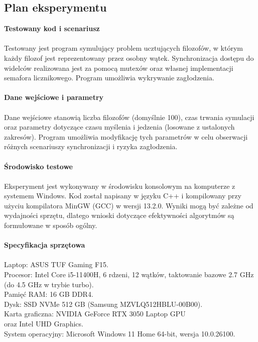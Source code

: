 \documentclass[a4paper,12pt]{article}
\begin{document}
        \subsection{Plan eksperymentu}
            \vspace{1em}
        	\textbf{Testowany kod i scenariusz}\\
            \vspace{-1.0em}\\
            Testowany jest program symulujący problem ucztujących filozofów, w którym każdy filozof jest reprezentowany przez osobny wątek. Synchronizacja dostępu do widelców realizowana jest za pomocą mutexów oraz własnej implementacji semafora licznikowego. Program umożliwia wykrywanie zagłodzenia.\\
            \vspace{0.5em}\\
        	\textbf{Dane wejściowe i parametry}\\
            \vspace{-1.0em}\\
            Dane wejściowe stanowią liczba filozofów (domyślnie 100), czas trwania symulacji oraz parametry dotyczące czasu myślenia i jedzenia (losowane z ustalonych zakresów). Program umożliwia modyfikację tych parametrów w celu obserwacji różnych scenariuszy synchronizacji i ryzyka zagłodzenia.\\
            \vspace{0.5em}\\
        	\textbf{Środowisko testowe}\\
            \vspace{-0.5em}\\
            Eksperyment jest wykonywany w środowisku konsolowym na komputerze z systemem Windows. Kod został napisany w języku C++ i kompilowany przy użyciu kompilatora MinGW (GCC) w wersji 13.2.0. Wyniki mogą być zależne od wydajności sprzętu, dlatego wnioski dotyczące efektywności algorytmów są formułowane w sposób ogólny.\\
            \vspace{1em}\\
        	\textbf{Specyfikacja sprzętowa}\\
            \vspace{-0.5em}\\
            Laptop: ASUS TUF Gaming F15.\\
            Procesor: Intel Core i5-11400H, 6 rdzeni, 12 wątków, taktowanie bazowe 2.7 GHz (do 4.5 GHz w trybie turbo).\\
            Pamięć RAM: 16 GB DDR4.\\
            Dysk: SSD NVMe 512 GB (Samsung MZVLQ512HBLU-00B00).\\
            Karta graficzna: NVIDIA GeForce RTX 3050 Laptop GPU\\oraz Intel UHD Graphics.\\
            System operacyjny: Microsoft Windows 11 Home 64-bit, wersja 10.0.26100.
        \newpage
        \vspace*{2em}
\end{document}
